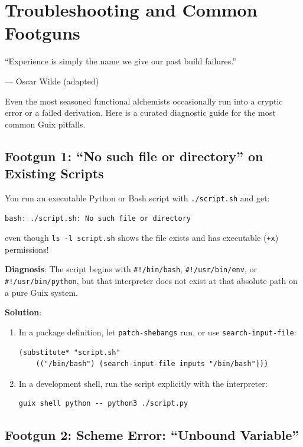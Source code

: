 \chapter{Troubleshooting and Common Footguns}
\label{appendix:troubleshooting}

\epigraph{``Experience is simply the name we give our past build failures.''}{--- Oscar Wilde (adapted)}

\noindent
Even the most seasoned functional alchemists occasionally run into a cryptic error or a failed derivation. Here is a curated diagnostic guide for the most common Guix pitfalls.

\section{Footgun 1: ``No such file or directory'' on Existing Scripts}

\begin{tcolorbox}[colback=footgunred!5!white,colframe=footgunred,title=Symptom]
You run an executable Python or Bash script with \texttt{./script.sh} and get:
\begin{lstlisting}[style=guixcli]
bash: ./script.sh: No such file or directory
\end{lstlisting}
even though \texttt{ls -l script.sh} shows the file exists and has executable (\texttt{+x}) permissions!
\end{tcolorbox}

\textbf{Diagnosis}: The script begins with \texttt{\#!/bin/bash}, \texttt{\#!/usr/bin/env}, or \texttt{\#!/usr/bin/python}, but that interpreter does not exist at that absolute path on a pure Guix system.

\textbf{Solution}:
\begin{enumerate}
  \item In a package definition, let \texttt{patch-shebangs} run, or use \texttt{search-input-file}:
  \begin{lstlisting}[style=guixscheme]
  (substitute* "script.sh"
    (("/bin/bash") (search-input-file inputs "/bin/bash")))
  \end{lstlisting}
  \item In a development shell, run the script explicitly with the interpreter:
  \begin{lstlisting}[style=guixcli]
  guix shell python -- python3 ./script.py
  \end{lstlisting}
\end{enumerate}

\section{Footgun 2: Scheme Error: ``Unbound Variable''}

